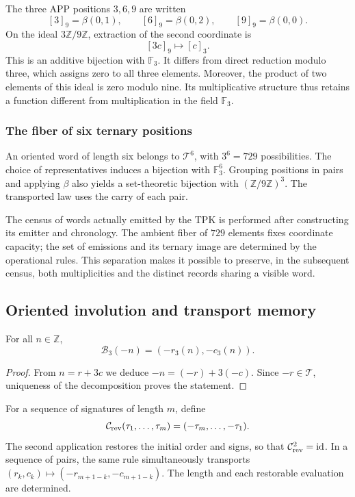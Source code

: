 The three APP positions \(3,6,9\) are written
\[
 [3]_9=\beta(0,1),\qquad
 [6]_9=\beta(0,2),\qquad
 [9]_9=\beta(0,0).
\]
On the ideal \(3\mathbb Z/9\mathbb Z\), extraction of the second
coordinate is
\[
 [3c]_9\longmapsto[c]_3.
\]
This is an additive bijection with \(\mathbb F_3\). It differs from
direct reduction modulo three, which assigns zero to all three elements.
Moreover, the product of two elements of this ideal is zero modulo nine.
Its multiplicative structure thus retains a function different from
multiplication in the field \(\mathbb F_3\).

\subsubsection{The fiber of six ternary positions}

An oriented word of length six belongs to \(\mathcal T^6\),
with \(3^6=729\) possibilities. The choice of representatives induces a
bijection with \(\mathbb F_3^6\). Grouping positions in pairs and
applying \(\beta\) also yields a set-theoretic bijection with
\((\mathbb Z/9\mathbb Z)^3\). The transported law uses the carry
of each pair.

The census of words actually emitted by the TPK is performed after
constructing its emitter and chronology. The ambient fiber of \(729\)
elements fixes coordinate capacity; the set of emissions and its ternary
image are determined by the operational rules. This separation makes it possible
to preserve, in the subsequent census, both multiplicities and the
distinct records sharing a visible word.

\subsection{Oriented involution and transport memory}
\label{trit:involucion}

\begin{proposicion}
For all \(n\in\mathbb Z\),
\[
 \mathcal B_3(-n)=(-r_3(n),-c_3(n)).
\]
\end{proposicion}
\begin{proof}
From \(n=r+3c\) we deduce \(-n=(-r)+3(-c)\). Since \(-r\in\mathcal T\),
uniqueness of the decomposition proves the statement.
\end{proof}

For a sequence of signatures of length \(m\), define
\[
 \mathcal C_{\rm rev}(\tau_1,\ldots,\tau_m)
 =(-\tau_m,\ldots,-\tau_1).
\]
The second application restores the initial order and signs, so
that \(\mathcal C_{\rm rev}^{2}=\operatorname{id}\). In a sequence
of pairs, the same rule simultaneously transports
\((r_k,c_k)\mapsto(-r_{m+1-k},-c_{m+1-k})\). The length and each
restorable evaluation are determined.

